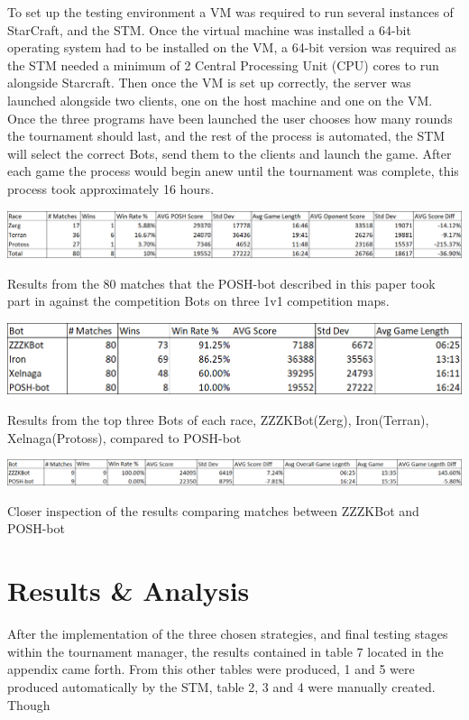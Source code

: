 \documentclass[journal]{IEEEtran}
\begin{document}
	To set up the testing environment a VM was required to run several instances of StarCraft, and the STM. Once the virtual machine was installed a 64-bit operating system had to be installed on the VM, a 64-bit version was required as the STM needed a minimum of 2 Central Processing Unit (CPU) cores to run alongside Starcraft. Then once the VM is set up correctly, the server was launched alongside two clients, one on the host machine and one on the VM. Once the three programs have been launched the user chooses how many rounds the tournament should last, and the rest of the process is automated, the STM will select the correct Bots, send them to the clients and launch the game. After each game the process would begin anew until the tournament was complete, this process took approximately 16 hours. 
	\begin{table}[]
		\centering
		\includegraphics[width=\textwidth]{POSH-botWin}
		\caption{Results from the 80 matches that the POSH-bot described in this paper took part in against the competition Bots on three 1v1 competition maps.}
		\label{Table3}
		\centering
		\includegraphics[width=\textwidth]{TopThreeWin}
		\caption{Results from the top three Bots of each race, ZZZKBot(Zerg), Iron(Terran), Xelnaga(Protoss), compared to POSH-bot}
		\label{Table4}
		\centering
		\includegraphics[width=\textwidth]{PvsZ}
		\caption{Closer inspection of the results comparing matches between ZZZKBot and POSH-bot}
		\label{Table5}
	\end{table}
	
	\section{Results \& Analysis}
	After the implementation of the three chosen strategies, and final testing stages within the tournament manager, the results contained in table 7 located in the appendix came forth. From this other tables were produced, 1 and 5 were produced automatically by the STM, table 2, 3 and 4 were manually created. Though
	
\end{document}
